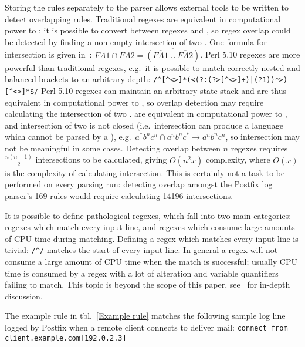 \documentclass[draft]{svmult}
\newcommand{\refwithlabel}[2]{%
    #1~\vref{#2}%
}
\newcommand{\tableref}[1]{%
    \refwithlabel{tbl.}{#1}%
}
\newcommand{\tab}[0]{%
    \hspace*{2em}%
}
\newcommand{\numberOFrules}[0]{%
    169%
}
\newcommand{\numberOFruleINTERSECTIONS}[0]{%
    14196%
}
\begin{document}
Storing the rules separately to the parser allows external tools to be
written to detect overlapping rules.  Traditional regexes are equivalent in
computational power to \FA{}; it is possible to convert between regexes and
\FA{}, so regex overlap could be detected by finding a non-empty
intersection of two \FA{}\@.  One formula for \FA{} intersection is given
in~\cite{intersection-of-NFA-using-Z}: $FA1 \cap{} FA2 =
\overline{(\overline{FA1} \cup{} \overline{FA2})}$.  Perl 5.10 regexes are
more powerful than traditional regexes, e.g.\ it is possible to match
correctly nested and balanced brackets to an arbitrary depth:
\newline{}\tab{}\verb!/^[^<>]*(<(?:(?>[^<>]+)|(?1))*>)[^<>]*$/!\newline{}
Perl 5.10 regexes can maintain an arbitrary state stack and are thus
equivalent in computational power to \PDA{}, so overlap detection may
require calculating the intersection of two \PDA{}\@.  \CFL{} are
equivalent in computational power to \PDA{}, and intersection of two
 is not closed (i.e.\ intersection can produce a language which
cannot be parsed by a \CFL{}), e.g.\ $a^{*}b^{n}c^{n} \cap a^{n}b^{n}c^{*}
\rightarrow a^{n}b^{n}c^{n}$, so \PDA{} intersection may not be meaningful
in some cases.  Detecting overlap between $n$ regexes requires
$\frac{n(n-1)}{2}$ intersections to be calculated, giving $O(n^2x)$
complexity, where $O(x)$ is the complexity of calculating intersection.
This is certainly not a task to be performed on every parsing run:
detecting overlap amongst the Postfix log parser's \numberOFrules{} rules
would require calculating \numberOFruleINTERSECTIONS{} intersections.

It is possible to define pathological regexes, which fall into two main
categories: regexes which match every input line, and regexes which consume
large amounts of CPU time during matching.  Defining a regex which matches
every input line is trivial: \verb!/^/! matches the start of every input
line.  In general a regex will not consume a large amount of CPU time when
the match is successful; usually CPU time is consumed by a regex with a lot
of alteration and variable quantifiers failing to match.  This topic is
beyond the scope of this paper, see~\cite{mastering-regular-expressions}
for in-depth discussion.

The example rule in \tableref{Example rule} matches the following sample
log line logged by Postfix when a remote client connects to deliver mail:
\newline{}\tab{}\verb!connect from client.example.com[192.0.2.3]!
\end{document}
